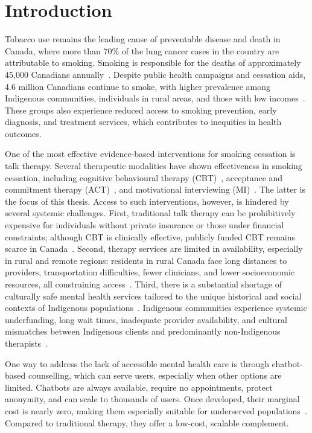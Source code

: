 \chapter{Introduction}

Tobacco use remains the leading cause of preventable disease and death in Canada, where more than 70\% of the lung cancer cases in the country are attributable to smoking. Smoking is responsible for the deaths of approximately 45,000 Canadians annually~\cite{poirier2019estimates}. Despite public health campaigns and cessation aids, 4.6 million Canadians continue to smoke, with higher prevalence among Indigenous communities, individuals in rural areas, and those with low incomes~\cite{cpac2020lung}. These groups also experience reduced access to smoking prevention, early diagnosis, and treatment services, which contributes to inequities in health outcomes.

One of the most effective evidence-based interventions for smoking cessation is talk therapy. Several therapeutic modalities have shown effectiveness in smoking cessation, including cognitive behavioural therapy (CBT)~\cite{beck2011cognitive}, acceptance and commitment therapy (ACT)~\cite{hayes1999acceptance}, and motivational interviewing (MI)~\cite{MillerRollnick2023}. The latter is the focus of this thesis. Access to such interventions, however, is hindered by several systemic challenges. First, traditional talk therapy can be prohibitively expensive for individuals without private insurance or those under financial constraints; although CBT is clinically effective, publicly funded CBT remains scarce in Canada~\cite{doi:10.1177/0253717620957496,doi:10.1177/0706743716642416}. Second, therapy services are limited in availability, especially in rural and remote regions: residents in rural Canada face long distances to providers, transportation difficulties, fewer clinicians, and lower socioeconomic resources, all constraining access~\cite{burns2007rural,james2021improving}. Third, there is a substantial shortage of culturally safe mental health services tailored to the unique historical and social contexts of Indigenous populations~\cite{josewski2023improving,hartwasekeesikaw2009cultural}. Indigenous communities experience systemic underfunding, long wait times, inadequate provider availability, and cultural mismatches between Indigenous clients and predominantly non-Indigenous therapists~\cite{turner2018poverty}.


One way to address the lack of accessible mental health care is through chatbot-based counselling, which can serve users, especially when other options are limited. Chatbots are always available, require no appointments, protect anonymity, and can scale to thousands of users. Once developed, their marginal cost is nearly zero, making them especially suitable for underserved populations~\cite{torous2017digital,miner2016smartphone}. Compared to traditional therapy, they offer a low-cost, scalable complement.



